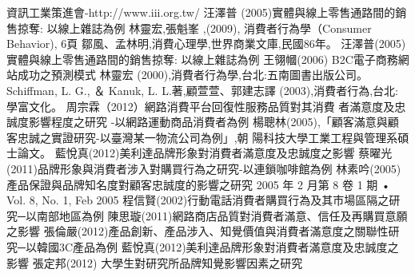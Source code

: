 \documentclass[a4paper,12pt]{report}
\begin{document}
\begin{thebibliography}{1}
資訊工業策進會-http://www.iii.org.tw/
汪澤普 (2005)實體與線上零售通路間的銷售掠奪: 以線上雜誌為例
林靈宏,張魁峯 ,(2009), 消費者行為學（Consumer Behavior), 6頁
鄒風、孟林明,消費心理學,世界商業文庫,民國86年。
汪澤普(2005)實體與線上零售通路間的銷售掠奪: 以線上雜誌為例
王翎幗(2006) B2C電子商務網站成功之預測模式
林靈宏 (2000),消費者行為學,台北:五南圖書出版公司。
Schiffman, L. G.,  ＆ Kanuk, L. L.著,顧萱萱、郭建志譯 (2003),消費者行為,台北: 學富文化。
周宗霖（2012）網路消費平台回復性服務品質對其消費 者滿意度及忠誠度影響程度之研究 -以網路運動商品消費者為例
楊聰林(2005),「顧客滿意與顧客忠誠之實證研究-以臺灣某一物流公司為例」,朝
  陽科技大學工業工程與管理系碩士論文。
藍悅真(2012)美利達品牌形象對消費者滿意度及忠誠度之影響
蔡曜光(2011)品牌形象與消費者涉入對購買行為之研究-以連鎖咖啡館為例
林素吟(2005)產品保證與品牌知名度對顧客忠誠度的影響之研究 2005 年 2 月第 8 卷 1 期 • Vol. 8, No. 1, Feb 2005
程信賢(2002)行動電話消費者購買行為及其市場區隔之研究─以南部地區為例
陳思璇(2011)網路商店品質對消費者滿意、信任及再購買意願之影響
張倫嚴(2012)產品創新、產品涉入、知覺價值與消費者滿意度之關聯性研究─以韓國3C產品為例
藍悅真(2012)美利達品牌形象對消費者滿意度及忠誠度之影響
張定邦(2012) 大學生對研究所品牌知覺影響因素之研究
\end{thebibliography}
\clearpage
\end{document}
